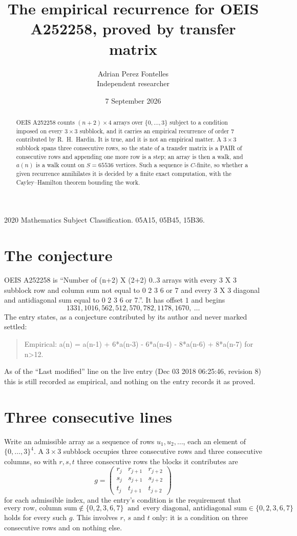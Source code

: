 \documentclass[11pt,a4paper]{article}
\title{The empirical recurrence for OEIS A252258, proved by transfer matrix}
\author{Adrian Perez Fontelles\\ \small Independent researcher}
\date{7 September 2026}
\theoremstyle{plain}
\theoremstyle{definition}
\begin{document}
\maketitle

\begin{abstract}
OEIS A252258 counts $(n+2)\times4$ arrays over $\{0,\dots,3\}$ subject to a condition imposed on
every $3\times3$ subblock, and it carries an empirical recurrence of order $7$
contributed by R.~H.~Hardin. It is true, and it is not an empirical matter. A $3\times3$
subblock spans three consecutive rows, so the state of a transfer matrix is a PAIR of
consecutive rows and appending one more row is a step; an array is then a walk, and
$a(n)$ is a walk count on $S=65536$ vertices. Such a sequence is $C$-finite, so whether a given
recurrence annihilates it is decided by a finite exact computation, with the Cayley--Hamilton
theorem bounding the work.
\end{abstract}

\noindent\small 2020 Mathematics Subject Classification. 05A15, 05B45, 15B36.\normalsize

\section{The conjecture}

OEIS A252258 is ``Number of (n+2) X (2+2) 0..3 arrays with every 3 X 3 subblock row and column sum not equal to 0 2 3 6 or 7 and every 3 X 3 diagonal and antidiagonal sum equal to 0 2 3 6 or 7.''. It has offset $1$ and begins
\[
1331, 1016, 562, 512, 570, 782, 1178, 1670,\ \dots
\]
The entry states, as a conjecture contributed by its author and never marked settled:
\begin{quote}
Empirical: a(n) = a(n-1) + 6*a(n-3) - 6*a(n-4) - 8*a(n-6) + 8*a(n-7) for n>12.
\end{quote}
As of the ``Last modified'' line on the live entry (Dec 03 2018 06:25:46, revision 8) this is still
recorded as empirical, and nothing on the entry records it as proved.

\section{Three consecutive lines}

Write an admissible array as a sequence of rows $u_1,u_2,\dots$, each an element of
$\{0,\dots,3\}^{4}$. A $3\times3$ subblock occupies three consecutive rows and
three consecutive columns, so with $r,s,t$ three consecutive rows the blocks it
contributes are
\[
g=\begin{pmatrix}r_j&r_{j+1}&r_{j+2}\\ s_j&s_{j+1}&s_{j+2}\\ t_j&t_{j+1}&t_{j+2}\end{pmatrix}
\]
for each admissible index, and the entry's condition is the requirement that
\[
\text{every row, column sum} \notin \{0,2,3,6,7\}\ \text{ and }\ \text{every diagonal, antidiagonal sum} \in \{0,2,3,6,7\}
\]
holds for every such $g$. This involves $r$, $s$ and $t$ only: it is a condition on
three consecutive rows and on nothing else.
\end{document}
